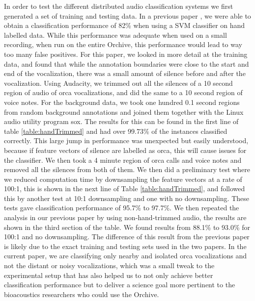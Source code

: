 In order to test the different distributed audio classification
systems we first generated a set of training and testing data.  In a
previous paper \cite{ness2008}, we were able to obtain a
classification performance of 82\% when using a SVM classifier on hand
labelled data.  While this performance was adequate when used on a
small recording, when run on the entire Orchive, this performance
would lead to way too many false positives.  For this paper, we looked
in more detail at the training data, and found that while the
annotation boundaries were close to the start and end of the
vocalization, there was a small amount of silence before and after the
vocalization.  Using Audacity, we trimmed out all the silences of a 10
second region of audio of orca vocalizations, and did the same to a 10
second region of voice notes.  For the background data, we took one
hundred 0.1 second regions from random background annotations and
joined them together with the Linux audio utility program sox.  The
results for this can be found in the first line of table
\ref{table:handTrimmed} and had over 99.73\% of the instances
classified correctly.  This large jump in performance was unexpected
but easily understood, because if feature vectors of silence are
labelled as orca, this will cause issues for the classifier.  We then
took a 4 minute region of orca calls and voice notes and removed all
the silences from both of them.  We then did a preliminary test where
we reduced computation time by downsampling the feature vectors at a
rate of 100:1, this is shown in the next line of Table
\ref{table:handTrimmed}, and followed this by another test at 10:1
downsampling and one with no downsampling.  These tests gave
classification performance of 95.7\% to 97.7\%.  We then repeated the
analysis in our previous paper by using non-hand-trimmed audio, the
results are shown in the third section of the table.  We found results
from 88.1\% to 93.0\% for 100:1 and no downsampling.  The difference
of this result from the previous paper is likely due to the exact
training and testing sets used in the two papers.  In the current
paper, we are classifying only nearby and isolated orca vocalizations
and not the distant or noisy vocalizations, which was a small tweak to
the experimental setup that has also helped us to not only achieve
better classification performance but to deliver a science goal more
pertinent to the bioacoustics researchers who could use the Orchive.

